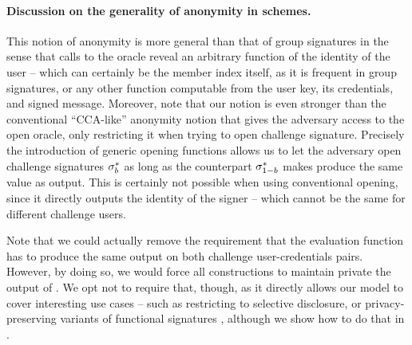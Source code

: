 \paragraph{Discussion on the generality of anonymity in \UAS schemes.} %
This notion of anonymity is more general than that of group signatures in the
sense that calls to the \OPEN oracle reveal an arbitrary function of the
identity of the user -- which can certainly be the member index itself, as it
is frequent in group signatures, or any other function computable from the
user key, its credentials, and signed message. Moreover, note that
our notion is even stronger than the conventional ``CCA-like'' anonymity notion
that gives the adversary access to the open oracle, only restricting it when
trying to open challenge signature. Precisely the introduction of generic
opening functions allows us to let the adversary open challenge signatures
$\mathsf{\sigma}^*_b$ as long as the counterpart $\mathsf{\sigma}^*_{1-b}$
makes \Open produce the same \y value as output. This is certainly not
possible when using conventional opening, since it directly outputs the identity
of the signer -- which cannot be the same for different challenge users.

Note that we could actually remove the requirement that the evaluation function
has to produce the same output on both challenge user-credentials pairs.
However, by doing so, we would force all constructions to maintain private the
output of \feval. We opt not to require that, though, as it directly allows
our model to cover interesting use cases -- such as restricting to selective
disclosure, or privacy-preserving variants of functional signatures , although we show how to do that in .

